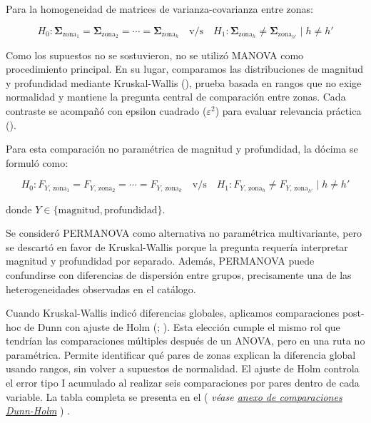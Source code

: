 \documentclass[
  spanish,
  letterpaper,
  DIV=11,
  numbers=noendperiod]{scrartcl}
\newcommand{\asesoriaParenRef}[1]{%
  \textnormal{\textcolor{asesoriaTextColor}{(}}%
  {\hypersetup{linkcolor=asesoriaLinkColor,urlcolor=asesoriaLinkColor,citecolor=asesoriaLinkColor}\textcolor{asesoriaTextColor}{\emph{#1}}}%
  \textnormal{\textcolor{asesoriaTextColor}{)}}%
}
\begin{document}
Para la homogeneidad de matrices de varianza-covarianza entre zonas:

\vspace{-1.10em}
\[
H_0: \boldsymbol{\Sigma}_{\text{zona}_1}
=\boldsymbol{\Sigma}_{\text{zona}_2}
=\cdots
=\boldsymbol{\Sigma}_{\text{zona}_k}
\quad \text{v/s} \quad
H_1: \boldsymbol{\Sigma}_{\text{zona}_h}
\neq
\boldsymbol{\Sigma}_{\text{zona}_{h'}} \mid h \neq h'
\]
\vspace{-1.15em}

Como los supuestos no se sostuvieron, no se utilizó MANOVA como
procedimiento principal. En su lugar, comparamos las distribuciones de
magnitud y profundidad mediante Kruskal-Wallis
(), prueba
basada en rangos que no exige normalidad y mantiene la pregunta central
de comparación entre zonas. Cada contraste se acompañó con epsilon
cuadrado (\(\varepsilon^2\)) para evaluar relevancia práctica
().

Para esta comparación no paramétrica de magnitud y profundidad, la
dócima se formuló como:

\vspace{-1.10em}
\[
H_0: F_{Y,\,\text{zona}_1}=F_{Y,\,\text{zona}_2}=\cdots=F_{Y,\,\text{zona}_k}
\quad \text{v/s} \quad
H_1: F_{Y,\,\text{zona}_h}\neq F_{Y,\,\text{zona}_{h'}} \mid h \neq h'
\]
\vspace{-1.15em}

donde \(Y \in \{\text{magnitud},\text{profundidad}\}\).

\endgroup

Se consideró PERMANOVA como alternativa no paramétrica multivariante,
pero se descartó en favor de Kruskal-Wallis porque la pregunta requería
interpretar magnitud y profundidad por separado. Además, PERMANOVA puede
confundirse con diferencias de dispersión entre grupos, precisamente una
de las heterogeneidades observadas en el catálogo.

Cuando Kruskal-Wallis indicó diferencias globales, aplicamos
comparaciones post-hoc de Dunn con ajuste de Holm
(; ). Esta elección cumple el mismo rol que tendrían las comparaciones
múltiples después de un ANOVA, pero en una ruta no paramétrica. Permite
identificar qué pares de zonas explican la diferencia global usando
rangos, sin volver a supuestos de normalidad. El ajuste de Holm controla
el error tipo I acumulado al realizar seis comparaciones por pares
dentro de cada variable. La tabla completa se presenta en el
\asesoriaParenRef{véase \hyperref[sec-anexo-dunn]{anexo de comparaciones Dunn-Holm}}.
\end{document}
